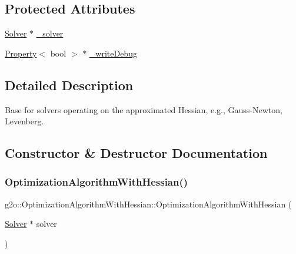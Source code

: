 \subsection*{Protected Attributes}
\begin{DoxyCompactItemize}
\item 
\mbox{\hyperlink{classg2o_1_1_solver}{Solver}} $\ast$ \mbox{\hyperlink{classg2o_1_1_optimization_algorithm_with_hessian_a88a2d1dccee8f7481ece407f2681a151}{\+\_\+solver}}
\item 
\mbox{\hyperlink{classg2o_1_1_property}{Property}}$<$ bool $>$ $\ast$ \mbox{\hyperlink{classg2o_1_1_optimization_algorithm_with_hessian_a6dd1e4e8dc2d09233c40de02b2c9fe8c}{\+\_\+write\+Debug}}
\end{DoxyCompactItemize}


\subsection{Detailed Description}
Base for solvers operating on the approximated Hessian, e.\+g., Gauss-\/\+Newton, Levenberg. 

\subsection{Constructor \& Destructor Documentation}
\mbox{\label{classg2o_1_1_optimization_algorithm_with_hessian_a1358f3500efe8b95a5af4a1b0edecdf0}} 
\subsubsection{\texorpdfstring{Optimization\+Algorithm\+With\+Hessian()}{OptimizationAlgorithmWithHessian()}}
{\footnotesize\ttfamily g2o\+::\+Optimization\+Algorithm\+With\+Hessian\+::\+Optimization\+Algorithm\+With\+Hessian (\begin{DoxyParamCaption}\item[{\mbox{\hyperlink{classg2o_1_1_solver}{Solver}} $\ast$}]{solver }\end{DoxyParamCaption})\hspace{0.3cm}{\ttfamily [explicit]}}

